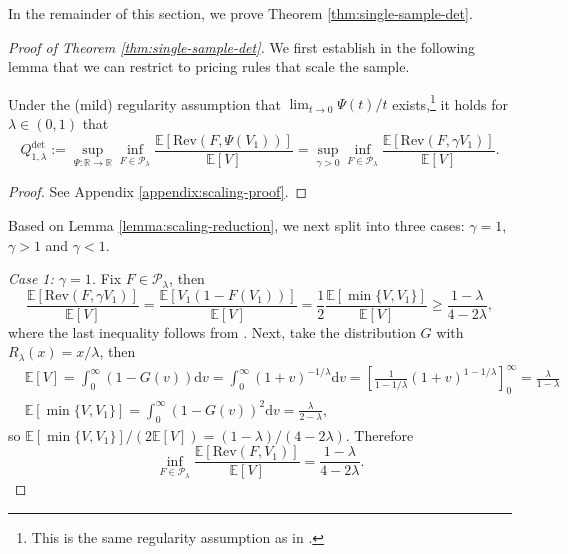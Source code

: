 \documentclass[11pt]{article}
\newcommand{\E}{\mathbb{E}}
\newcommand{\dd}{\mathrm{d}}
\newcommand{\Rev}{\mathrm{Rev}}
\begin{document}
In the remainder of this section, we prove Theorem \ref{thm:single-sample-det}.
\begin{proof}[Proof of Theorem \ref{thm:single-sample-det}]
We first establish in the following lemma that we can restrict to pricing rules that scale the sample. 

\begin{lemma}
    \label{lemma:scaling-reduction}
    Under the (mild) regularity assumption that $\lim_{t\to 0}\Psi(t)/t$ exists,\footnote{This is the same regularity assumption as in \cite[Proposition 1]{allouah2022pricing}.} it holds for $\lambda \in (0,1)$ that
    $$
    	Q^{\mathrm{det}}_{1,\lambda}:=\sup_{\Psi:\mathbb{R}\to\mathbb{R}}\inf_{F\in\mathcal{P}_\lambda}\frac{\E[\Rev(F,\Psi(V_1))]}{\E[V]}=\sup_{\gamma > 0}\inf_{F\in\mathcal{P}_\lambda}\frac{\E[\Rev(F,\gamma V_1)]}{\E[V]}.
    $$
\end{lemma}
\begin{proof}
See Appendix \ref{appendix:scaling-proof}.
\end{proof}

\noindent Based on Lemma \ref{lemma:scaling-reduction}, we next split into three cases: $\gamma=1$, $\gamma>1$ and $\gamma <1$. 

    \noindent\textit{Case 1: $\gamma = 1$.} Fix $F\in\mathcal{P}_\lambda$, then
    $$
        \frac{\E[\mathrm{Rev}(F, \gamma V_1)]}{\E[V]}=\frac{\E[V_1(1-F(V_1))]}{\E[V]}=\frac{1}{2}\frac{\E[\min\{V,V_1\}]}{\E[V]}\ge\frac{1-\lambda}{4-2\lambda},
    $$
    where the last inequality follows from \cite[Proposition 10]{schweizer2019performance}.
    Next, take the distribution $G$ with $R_\lambda(x)=x/\lambda$, then
    \begin{align*}
        &\E[V]=\int_0^\infty(1-G(v))\dd v=\int_0^\infty(1+v)^{-1/\lambda}\dd v=\left[\frac{1}{1-1/\lambda}(1+v)^{1-1/\lambda}\right]_0^\infty=\frac{\lambda}{1-\lambda}\\
        &\E[\min\{V,V_1\}]=\int_0^\infty(1-G(v))^2\dd v=\frac{\lambda}{2-\lambda}, 
    \end{align*}
    so $\E[\min\{V,V_1\}]/(2\E[V])=(1-\lambda)/(4-2\lambda)$. Therefore
    $$
    \inf_{F\in\mathcal{P}_{\lambda}}\frac{\E[\mathrm{Rev}(F, V_1)]}{\E[V]}=\frac{1-\lambda}{4-2\lambda}.
    $$


\end{proof}
\end{document}
